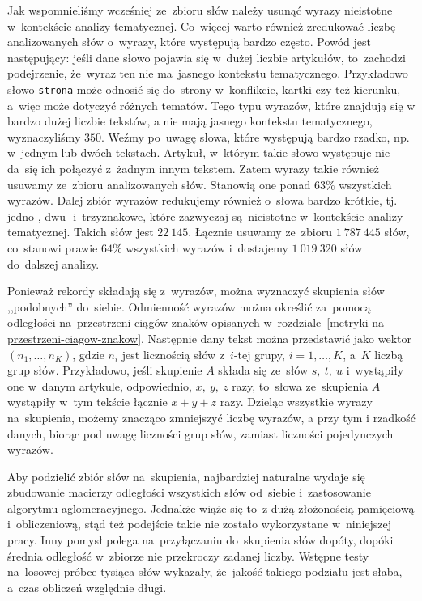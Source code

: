 \documentclass{praca1}
\begin{document}
Jak wspomnieliśmy wcześniej ze~zbioru słów należy usunąć wyrazy nieistotne w~kontekście analizy tematycznej. Co~więcej warto również zredukować liczbę analizowanych słów o~wyrazy, które występują bardzo często. Powód jest następujący: jeśli dane słowo pojawia się w~dużej liczbie artykułów, to~zachodzi podejrzenie, że~wyraz ten nie ma~jasnego kontekstu tematycznego. Przykładowo słowo \verb|strona| może odnosić się do~strony w~konflikcie, kartki czy też kierunku, a~więc może dotyczyć różnych tematów. Tego typu wyrazów, które znajdują się w bardzo dużej liczbie tekstów, a nie mają jasnego kontekstu tematycznego, wyznaczyliśmy $350$. Weźmy po~uwagę słowa, które występują bardzo rzadko, np. w~jednym lub dwóch tekstach. Artykuł, w~którym takie słowo występuje nie da~się ich połączyć z~żadnym innym tekstem. Zatem wyrazy takie również usuwamy ze~zbioru analizowanych słów. Stanowią one ponad $63\%$ wszystkich wyrazów. Dalej zbiór wyrazów redukujemy również o~słowa bardzo krótkie, tj. jedno-, dwu- i~trzyznakowe, które zazwyczaj są~nieistotne w~kontekście analizy tematycznej. Takich słów jest $22\ 145$. Łącznie usuwamy ze~zbioru $1\ 787\ 445$ słów, co~stanowi prawie $64\%$ wszystkich wyrazów i~dostajemy $1\ 019\ 320$ słów do~dalszej analizy.

Ponieważ rekordy składają się z~wyrazów, można wyznaczyć skupienia słów ,,podobnych'' do~siebie. Odmienność wyrazów można określić za~pomocą odległości na~przestrzeni ciągów znaków opisanych w~rozdziale~\ref{metryki-na-przestrzeni-ciagow-znakow}. Następnie dany tekst można przedstawić jako wektor $(n_1, \ldots, n_K)$, gdzie $n_i$ jest licznością słów z~$i$-tej grupy, $i=1,\ldots,K$, a~$K$ liczbą grup słów. Przykładowo, jeśli skupienie $A$ składa się ze~słów $s,\ t,\ u$ i~wystąpiły one w~danym artykule, odpowiednio, $x,\ y,\ z$ razy, to~słowa ze~skupienia $A$ wystąpiły w~tym tekście łącznie $x+y+z$ razy. Dzieląc wszystkie wyrazy na~skupienia, możemy znacząco zmniejszyć liczbę wyrazów, a przy tym i rzadkość danych, biorąc pod uwagę liczności grup słów, zamiast liczności pojedynczych wyrazów.

Aby podzielić zbiór słów na~skupienia, najbardziej naturalne wydaje się zbudowanie macierzy odległości wszystkich słów od~siebie i~zastosowanie algorytmu aglomeracyjnego. Jednakże wiąże się to~z dużą złożonością pamięciową i~obliczeniową, stąd też podejście takie nie zostało wykorzystane w~niniejszej pracy. Inny pomysł polega na~przyłączaniu do~skupienia słów dopóty, dopóki średnia odległość w~zbiorze nie przekroczy zadanej liczby. Wstępne testy na~losowej próbce tysiąca słów wykazały, że~jakość takiego podziału jest słaba, a~czas obliczeń względnie długi.
\end{document}

